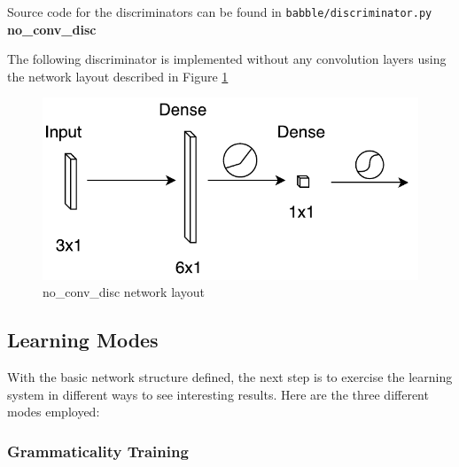 \documentclass[12pt]{article}
\begin{document}
Source code for the discriminators can be found in \texttt{babble/discriminator.py} \\

\noindent \textbf{no\_conv\_disc}

The following discriminator is implemented without any convolution layers using the network layout described in Figure \ref{fig:no_conv_disc}

\begin{figure}[ht]
    \centering
    \includegraphics{no_conv_disc.pdf}
    \caption{no\_conv\_disc network layout}
    \label{fig:no_conv_disc}
\end{figure}

\subsection{Learning Modes}

With the basic network structure defined, the next step is to exercise the learning system in different ways to see interesting results. Here are the three different modes employed:

\subsubsection{Grammaticality Training}
\end{document}
